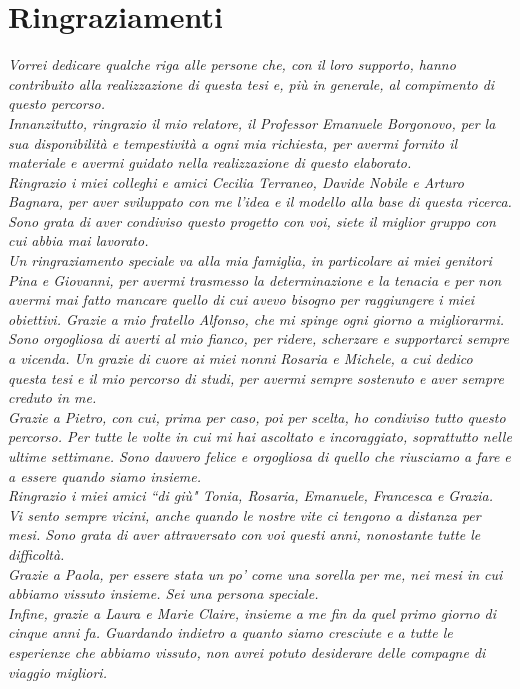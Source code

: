 \chapter*{Ringraziamenti}

\noindent \textit{Vorrei dedicare qualche riga alle persone che, con il loro supporto, hanno contribuito alla realizzazione di questa tesi e, più in generale, al compimento di questo percorso.} \\

\noindent \textit{Innanzitutto, ringrazio il mio relatore, il Professor Emanuele Borgonovo, per la sua disponibilità e tempestività a ogni mia richiesta, per avermi fornito il materiale e avermi guidato nella realizzazione di questo elaborato.} \\

\noindent \textit{Ringrazio i miei colleghi e amici Cecilia Terraneo, Davide Nobile e Arturo Bagnara, per aver sviluppato con me l'idea e il modello alla base di questa ricerca. Sono grata di aver condiviso questo progetto con voi, siete il miglior gruppo con cui abbia mai lavorato.} \\

\noindent \textit{Un ringraziamento speciale va alla mia famiglia, in particolare ai miei genitori Pina e Giovanni, per avermi trasmesso la determinazione e la tenacia e per non avermi mai fatto mancare quello di cui avevo bisogno per raggiungere i miei obiettivi. Grazie a mio fratello Alfonso, che mi spinge ogni giorno a migliorarmi. Sono orgogliosa di averti al mio fianco, per ridere, scherzare e supportarci sempre a vicenda. Un grazie di cuore ai miei nonni Rosaria e Michele, a cui dedico questa tesi e il mio percorso di studi, per avermi sempre sostenuto e aver sempre creduto in me.} \\

\noindent \textit{Grazie a Pietro, con cui, prima per caso, poi per scelta, ho condiviso tutto questo percorso. Per tutte le volte in cui mi hai ascoltato e incoraggiato, soprattutto nelle ultime settimane. Sono davvero felice e orgogliosa di quello che riusciamo a fare e a essere quando siamo insieme.} \\

\noindent \textit{Ringrazio i miei amici ``di giù" Tonia, Rosaria, Emanuele, Francesca e Grazia. Vi sento sempre vicini, anche quando le nostre vite ci tengono a distanza per mesi. Sono grata di aver attraversato con voi questi anni, nonostante tutte le difficoltà.} \\

\noindent \textit{Grazie a Paola, per essere stata un po' come una sorella per me, nei mesi in cui abbiamo vissuto insieme. Sei una persona speciale.} \\

\noindent \textit{Infine, grazie a Laura e Marie Claire, insieme a me fin da quel primo giorno di cinque anni fa. Guardando indietro a quanto siamo cresciute e a tutte le esperienze che abbiamo vissuto, non avrei potuto desiderare delle compagne di viaggio migliori.}